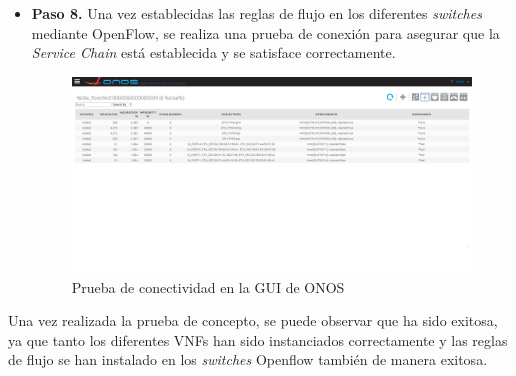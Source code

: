 \begin{itemize}
	\item \textbf{Paso 8.} Una vez establecidas las reglas de flujo en los diferentes \textit{switches} mediante OpenFlow, se realiza una prueba de conexión para asegurar que la \textit{Service Chain} está establecida y se satisface correctamente.
	
	\begin{figure}[!ht]
		\centering
		\includegraphics[width=0.9\linewidth]{imagenes/onos_flowrules}
		\caption{Prueba de conectividad en la \ac{GUI} de \ac{ONOS}}
		\label{fig:onosflowrules}
	\end{figure}


\end{itemize}

Una vez realizada la prueba de concepto, se puede observar que ha sido exitosa, ya que tanto los diferentes \acp{VNF} han sido instanciados correctamente y las reglas de flujo se han instalado en los \textit{switches} Openflow también de manera exitosa.

